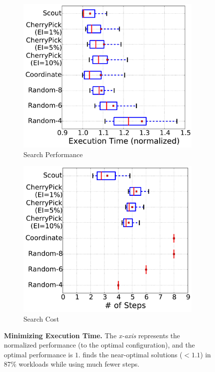 \begin{figure}[!htbp]
\centering
\begin{subfigure}[b]{0.4\textwidth}
    \includegraphics[width=\linewidth]{figures/single_time_overall_performance.pdf}
    \caption{Search Performance}
    \label{fig:single_time_overall_performance}
\end{subfigure}
\begin{subfigure}[b]{0.4\textwidth}
    \includegraphics[width=\linewidth]{figures/single_time_overall_steps.pdf}
    \caption{Search Cost}
    \label{fig:single_time_overall_steps}
\end{subfigure}
\caption{\small{\textbf{Minimizing Execution Time.}
 The \emph{x-axis} represents the normalized performance (to the optimal configuration), and the optimal performance is $1$. 
 \scout finds the near-optimal solutions ($< 1.1$) in 87\% workloads while using much fewer steps.}}
\label{fig:single_time_overall}
\end{figure}


